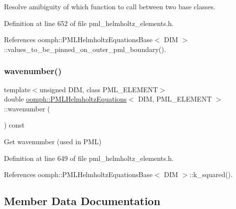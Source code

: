 Resolve amibiguity of which function to call between two base classes. 



Definition at line 652 of file pml\+\_\+helmholtz\+\_\+elements.\+h.



References oomph\+::\+P\+M\+L\+Helmholtz\+Equations\+Base$<$ D\+I\+M $>$\+::values\+\_\+to\+\_\+be\+\_\+pinned\+\_\+on\+\_\+outer\+\_\+pml\+\_\+boundary().

\mbox{\label{classoomph_1_1PMLHelmholtzEquations_a4d0d8d6e63e7e009948c17eaf829bfdb}} 
\subsubsection{\texorpdfstring{wavenumber()}{wavenumber()}}
{\footnotesize\ttfamily template$<$unsigned D\+IM, class P\+M\+L\+\_\+\+E\+L\+E\+M\+E\+NT$>$ \\
double \hyperlink{classoomph_1_1PMLHelmholtzEquations}{oomph\+::\+P\+M\+L\+Helmholtz\+Equations}$<$ D\+IM, P\+M\+L\+\_\+\+E\+L\+E\+M\+E\+NT $>$\+::wavenumber (\begin{DoxyParamCaption}{ }\end{DoxyParamCaption}) const\hspace{0.3cm}{\ttfamily [inline]}}



Get wavenumber (used in P\+ML) 



Definition at line 649 of file pml\+\_\+helmholtz\+\_\+elements.\+h.



References oomph\+::\+P\+M\+L\+Helmholtz\+Equations\+Base$<$ D\+I\+M $>$\+::k\+\_\+squared().



\subsection{Member Data Documentation}
\mbox{\label{classoomph_1_1PMLHelmholtzEquations_a9b81f7f0eadc87a9b29d1ea9a8e25953}} 
